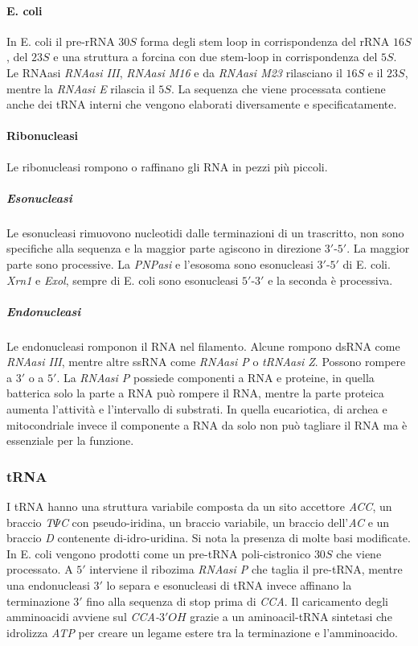 \paragraph{E. coli}
In E. coli il pre-rRNA $30S$ forma degli stem loop in corrispondenza del rRNA $16S$, del $23S$ e una struttura a forcina con due stem-loop in corrispondenza del $5S$. Le RNAasi 
\emph{RNAasi III}, \emph{RNAasi M16} e da \emph{RNAasi M23} rilasciano il $16S$ e il $23S$, mentre la \emph{RNAasi E} rilascia il $5S$. La sequenza che viene processata contiene
anche dei tRNA interni che vengono elaborati diversamente e specificatamente. 
\paragraph{Ribonucleasi}
Le ribonucleasi rompono o raffinano gli RNA in pezzi pi\`u piccoli.
\subparagraph{Esonucleasi}
Le esonucleasi rimuovono nucleotidi dalle terminazioni di un trascritto, non sono specifiche alla sequenza e la maggior parte agiscono in direzione $3'$-$5'$. La maggior parte sono
processive. La \emph{PNPasi} e l'esosoma sono esonucleasi $3'$-$5'$ di E. coli. \emph{Xrn1} e \emph{Exol}, sempre di E. coli sono esonucleasi $5'$-$3'$ e la seconda \`e processiva.
\subparagraph{Endonucleasi}
Le endonucleasi romponon il RNA nel filamento. Alcune rompono dsRNA come \emph{RNAasi III}, mentre altre ssRNA come \emph{RNAasi P} o \emph{tRNAasi Z}. Possono rompere a $3'$ o a $5'$. 
La \emph{RNAasi P} possiede componenti a RNA e proteine, in quella batterica solo la parte a RNA pu\`o rompere il RNA, mentre la parte proteica aumenta l'attivit\`a e l'intervallo di 
substrati. In quella eucariotica, di archea e mitocondriale invece il componente a RNA da solo non pu\`o tagliare il RNA ma \`e essenziale per la funzione.
\subsubsection{tRNA}
I tRNA hanno una struttura variabile composta da un sito accettore \emph{ACC}, un braccio \emph{T$\Psi$C} con pseudo-iridina, un braccio variabile, un braccio dell'\emph{AC} e un 
braccio \emph{D} contenente di-idro-uridina. Si nota la presenza di molte basi modificate. In E. coli vengono prodotti come un pre-tRNA poli-cistronico $30S$ che viene processato. A $5'$
interviene il ribozima \emph{RNAasi P} che taglia il pre-tRNA, mentre una endonucleasi $3'$ lo separa e esonucleasi di tRNA invece affinano la terminazione $3'$ fino alla sequenza di 
stop prima di \emph{CCA}. Il caricamento degli amminoacidi avviene sul \emph{CCA-$3'OH$} grazie a un aminoacil-tRNA sintetasi che idrolizza \emph{ATP} per creare un legame estere
tra la terminazione e l'amminoacido. 
